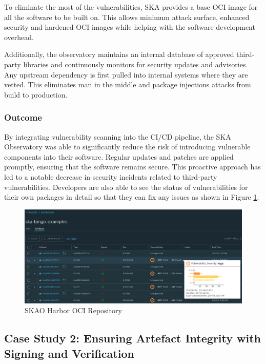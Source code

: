 \documentclass[a4paper]{spie}  %
\begin{document}
To eliminate the most of the vulnerabilities, SKA provides a base OCI image for all the software to be built on. This allows minimum attack surface, enhanced security and hardened OCI images while helping with the software development overhead.

Additionally, the observatory maintains an internal database of approved third-party libraries and continuously monitors for security updates and advisories. Any upstream dependency is first pulled into internal systems where they are vetted. This eliminates man in the middle and package injections attacks from build to production.

\subsubsection{Outcome}

By integrating vulnerability scanning into the CI/CD pipeline, the SKA Observatory was able to significantly reduce the risk of introducing vulnerable components into their software. Regular updates and patches are applied promptly, ensuring that the software remains secure. This proactive approach has led to a notable decrease in security incidents related to third-party vulnerabilities. Developers are also able to see the status of vulnerabilities for their own packages in detail so that they can fix any issues as shown in Figure \ref{fig:harbor}.

   \begin{figure} [ht]
   \begin{center}
   \includegraphics[width=\textwidth,height=\textheight,keepaspectratio]{harbor.png}
   \end{center}
   \caption 
   { \label{fig:harbor}
SKAO Harbor OCI Repository}
    \end{figure} 

\subsection{Case Study 2: Ensuring Artefact Integrity with Signing and Verification}
\end{document}
